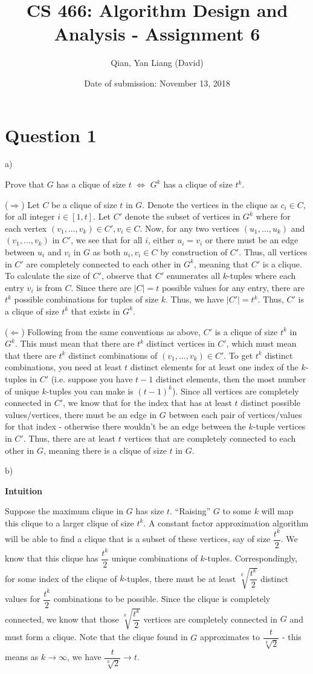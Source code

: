 \documentclass{article}
\title{CS 466: Algorithm Design and Analysis - Assignment 6}
\author{Qian, Yan Liang (David)}
\date{Date of submission: November 13, 2018}
\begin{document}
\newpage

\section{Question 1}

a)

Prove that $G$ has a clique of size $t$ $\iff$ $G^k$ has a clique of size $t^k$.

($\Rightarrow$) Let $C$ be a clique of size $t$ in $G$. Denote the vertices in the clique as $c_i \in C$, for all
integer $i \in [1, t]$. Let $C'$ denote the subset of vertices in $G^k$ where for each vertex $(v_1, \ldots, v_k) \in
C', v_i \in C$.  Now, for any two vertices $(u_1, \ldots, u_k)$ and $(v_1, \ldots, v_k)$ in $C'$, we see that for all
$i$, either $u_i = v_i$ or there must be an edge between $u_i$ and $v_i$ in $G$ as both $u_i, v_i \in C$ by construction
of $C'$. Thus, all vertices in $C'$ are completely connected to each other in $G^k$, meaning that $C'$ is a clique.  To
calculate the size of $C'$, observe that $C'$ enumerates all $k$-tuples where each entry $v_i$ is from $C$.  Since there
are $|C| = t$ possible values for any entry, there are $t^k$ possible combinations for tuples of size $k$. Thus, we have
$|C'| = t^k$. Thus, $C'$ is a clique of size $t^k$ that exists in $G^k$.

($\Leftarrow$) Following from the same conventions as above, $C'$ is a clique of size $t^k$ in $G^k$. This must mean
that there are $t^k$ distinct vertices in $C'$, which must mean that there are $t^k$ distinct combinations of $(v_1,
\ldots, v_k) \in C'$. To get $t^k$ distinct combinations, you need at least $t$ distinct elements for at least one index
of the $k$-tuples in $C'$ (i.e. suppose you have $t-1$ distinct elements, then the most number of unique $k$-tuples you can
make is $(t-1)^k$).  Since all vertices are completely connected in $C'$, we know that for the index that has at least
$t$ distinct possible values/vertices, there must be an edge in $G$ between each pair of vertices/values for that index
- otherwise there wouldn't be an edge between the $k$-tuple vertices in $C'$. Thus, there are at least $t$ vertices that
are completely connected to each other in $G$, meaning there is a clique of size $t$ in $G$.


b)

\textbf{Intuition}

Suppose the maximum clique in $G$ has size $t$. ``Raising'' $G$ to some $k$ will map this clique to a larger clique of
size $t^k$. A constant factor approximation algorithm will be able to find a clique that is a subset of these vertices,
say of size $\dfrac{t^k}{2}$. We know that this clique has $\dfrac{t^k}{2}$ unique combinations of $k$-tuples.
Correspondingly, for some index of the clique of $k$-tuples, there must be at least $\sqrt[k]{\dfrac{t^k}{2}}$ distinct
values for $\dfrac{t^k}{2}$ combinations to be possible.  Since the clique is completely connected, we know that those
$\sqrt[k]{\dfrac{t^k}{2}}$ vertices are completely connected in $G$ and must form a clique. Note that the clique
found in $G$ approximates to $\dfrac{t}{\sqrt[k]{2}}$ - this means as $k \rightarrow \infty$, we have
$\dfrac{t}{\sqrt[k]{2}} \rightarrow t$.
\end{document}
